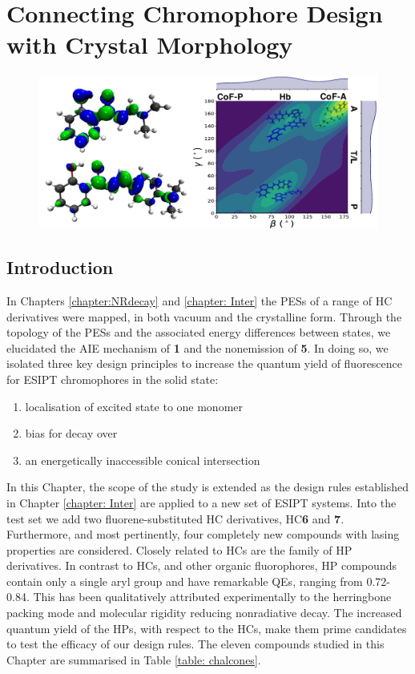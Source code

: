 \chapter[Connecting Chromophore Design with Crystal Morphology]{Connecting Chromophore Design with Crystal Morphology}
\label{chapter: Connecting}
\begin{figure}[H]
\centering
  \includegraphics[width=0.7\linewidth]{5ConnectingCrystalStructure/3toc.pdf}
\end{figure}
\section{Introduction}\label{section: Connecting_Introduction}

In Chapters \ref{chapter:NRdecay} and \ref{chapter: Inter} the \acp{PES} of a range of \ac{HC} derivatives were mapped, in both vacuum and the crystalline form. Through the topology of the PESs and the associated energy differences between states, we elucidated the AIE mechanism of \textbf{1} and the nonemission of \textbf{5}. In doing so, we isolated three key design principles to increase the quantum yield of fluorescence for ESIPT chromophores in the solid state:
\begin{enumerate}
    \item localisation of excited state to one monomer 
    \item bias for \Kstar{} decay over \Estar{}
    \item an energetically inaccessible conical intersection
\end{enumerate}

In this Chapter, the scope of the study is extended as the design rules established in Chapter  \ref{chapter: Inter} are applied to a new set of ESIPT systems. Into the test set we add two fluorene-substituted \ac{HC} derivatives, \ac{HC}\textbf{6} and \textbf{7}.\cite{Cheng2016} Furthermore, and most pertinently, four completely new compounds with lasing properties are considered.  Closely related to \acp{HC} are the family of \ac{HP} derivatives.\cite{Tang2016} In contrast to \acp{HC}, and other organic fluorophores, \ac{HP} compounds contain only a single aryl group and have remarkable QEs, ranging from 0.72-0.84. This has been qualitatively attributed experimentally to the herringbone packing mode and molecular rigidity reducing nonradiative decay. The increased quantum yield of the \acp{HP}, with respect to the \acp{HC}, make them prime candidates to test the efficacy of our  design rules. The eleven compounds studied in this Chapter are summarised in Table \ref{table: chalcones}.

